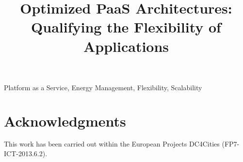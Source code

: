 \documentclass[10pt, conference, compsocconf]{IEEEtran}
\begin{document}
\title{Optimized PaaS Architectures: Qualifying the Flexibility of Applications}

\author{
}

\maketitle
\begin{abstract}

\end{abstract}

\begin{IEEEkeywords}
Platform as a Service, Energy Management, Flexibility, Scalability
\end{IEEEkeywords}









\section*{Acknowledgments}

This work has been carried out within the European Projects DC4Cities (FP7-ICT-2013.6.2).



\end{document}
